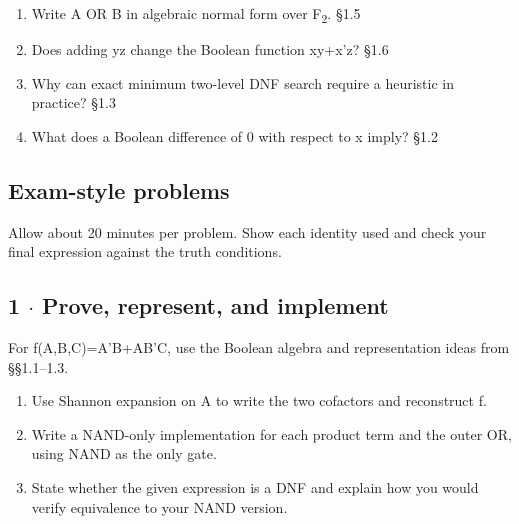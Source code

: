 \documentclass[11pt]{article}
\begin{document}
\begin{keepsection}
\begin{enumerate}
\item Write A OR B in algebraic normal form over F\textsubscript{2}. \hfill{\small\color{FAUblue}§1.5}
\item Does adding yz change the Boolean function xy+x'z? \hfill{\small\color{FAUblue}§1.6}
\item Why can exact minimum two-level DNF search require a heuristic in practice? \hfill{\small\color{FAUblue}§1.3}
\item What does a Boolean difference of 0 with respect to x imply? \hfill{\small\color{FAUblue}§1.2}
\end{enumerate}

\end{keepsection}

\begin{keepsection}
\section{Exam-style problems}

Allow about 20 minutes per problem. Show each identity used and check your final expression against the truth conditions.

\begin{keepsection}
\subsection{1 \ensuremath{\cdot} Prove, represent, and implement}

For f(A,B,C)=A'B+AB'C, use the Boolean algebra and representation ideas from §§1.1–1.3.

\begin{enumerate}
\item Use Shannon expansion on A to write the two cofactors and reconstruct f.
\item Write a NAND-only implementation for each product term and the outer OR, using NAND as the only gate.
\item State whether the given expression is a DNF and explain how you would verify equivalence to your NAND version.
\end{enumerate}

\end{keepsection}


\end{keepsection}
\end{document}
